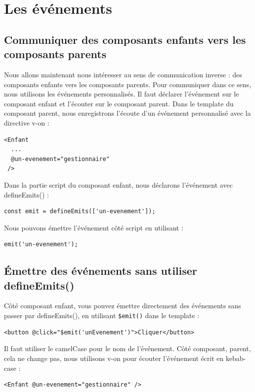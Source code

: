 
\section{Les événements}
\subsection{Communiquer des composants enfants vers les composants parents}
Nous allons maintenant nous intéresser au sens de communication inverse : des composants enfants vers les composants parents. Pour communiquer dans ce sens, nous utilisons les événements personnalisés. Il faut déclarer l'événement sur le composant enfant et l'écouter sur le composant parent. Dans le {\color{monOrange}template} du composant parent, nous enregistrons l'écoute d'un événement personnalisé avec la directive {\color{monOrange}v-on} :
\begin{verbatim}
<Enfant
  ...
  @un-evenement="gestionnaire"
 />
\end{verbatim}
Dans la partie {\color{monOrange}script} du composant enfant, nous déclarons l'événement avec {\color{monOrange}defineEmits()} :
\begin{verbatim}
const emit = defineEmits(['un-evenement']);
\end{verbatim}
Nous pouvons émettre l'événement côté {\color{monOrange}script} en utilisant :
\begin{verbatim}
emit('un-evenement');
\end{verbatim}

\subsection{Émettre des événements sans utiliser defineEmits()}
Côté composant enfant, vous pouvez émettre directement des événements sans passer par {\color{monOrange}defineEmits()}, en utilisant {\tt \$emit()} dans le {\color{monOrange}template} :
\begin{verbatim}
<button @click="$emit('unEvenement')">Cliquer</button>
\end{verbatim}
Il faut utiliser le {\color{monOrange}camelCase} pour le nom de l'événement. Côté composant, parent, cela ne change pas, nous utilisons {\color{monOrange}v-on} pour écouter l'événement écrit en {\color{monOrange}kebab-case} :
\begin{verbatim}
<Enfant @un-evenement="gestionnaire" />
\end{verbatim}

